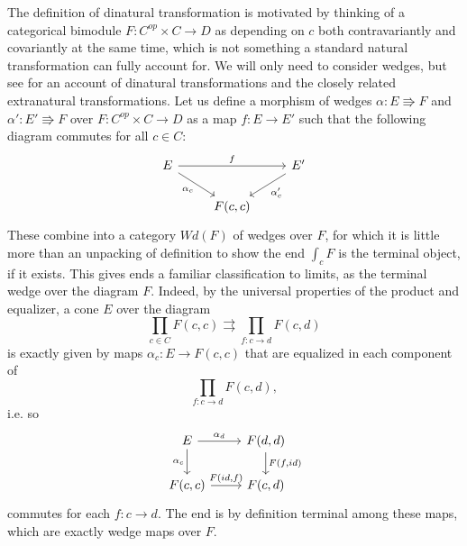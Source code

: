 The definition of dinatural transformation is motivated by thinking of a categorical bimodule $F:C^{op}\times C\rightarrow D$ as depending on $c$ both contravariantly and covariantly at the same time, which is not something a standard natural transformation can fully account for. We will only need to consider wedges, but see \cite{Loregian21} for an account of dinatural transformations and the closely related extranatural transformations. Let us define a morphism of wedges $\alpha:E\Rrightarrow F$ and $\alpha':E'\Rrightarrow F$ over $F:C^{op}\times C\rightarrow D$ as a map $f:E\rightarrow E'$ such that the following diagram commutes for all $c\in C$:
\[\begin{tikzcd}
E \arrow[rd, "\alpha_c"'] \arrow[rr, "f"] &          & E' \arrow[ld, "\alpha'_c"] \\
                                          & {F(c,c)} &                           
\end{tikzcd}\]
These combine into a category $Wd(F)$ of wedges over $F$, for which it is little more than an unpacking of definition to show the end $\int_c F$ is the terminal object, if it exists. This gives ends a familiar classification to limits, as the terminal wedge over the diagram $F$. Indeed, by the universal properties of the product and equalizer, a cone $E$ over the diagram $$\prod_{c\in C}F(c,c)\rightrightarrows \prod_{f:c\rightarrow d} F(c,d)$$ is exactly given by maps $\alpha_c:E\rightarrow F(c,c)$ that are equalized in each component of $$\prod_{f:c\rightarrow d} F(c,d),$$ i.e. so
\[\begin{tikzcd}
E \arrow[d, "\alpha_c"'] \arrow[r, "\alpha_d"] & {F(d,d)} \arrow[d, "{F(f,id)}"] \\
{F(c,c)} \arrow[r, "{F(id,f)}"]                & {F(c,d)}                       
\end{tikzcd}\]
commutes for each $f:c\rightarrow d$. The end is by definition terminal among these maps, which are exactly wedge maps over $F.$

